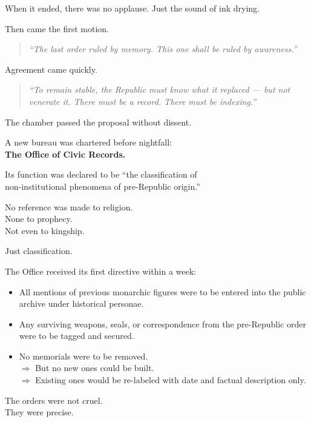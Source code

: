 \documentclass[12pt]{article}
\begin{document}
When it ended, there was no applause. Just the sound of ink drying.

Then came the first motion.

\begin{quote}
\textit{“The last order ruled by memory. This one shall be ruled by awareness.”}
\end{quote}

Agreement came quickly.

\begin{quote}
\textit{“To remain stable, the Republic must know what it replaced --- but not venerate it. There must be a record. There must be indexing.”}
\end{quote}

The chamber passed the proposal without dissent.

A new bureau was chartered before nightfall:\\
\textbf{The Office of Civic Records.}

Its function was declared to be ``the classification of \\
non-institutional phenomena of pre-Republic origin.''

No reference was made to religion.\\
None to prophecy.\\
Not even to kingship.

Just classification.

\vspace{1em}

The Office received its first directive within a week:

\begin{itemize}
    \item All mentions of previous monarchic figures were to be entered into the public archive under historical personae.
    \item Any surviving weapons, seals, or correspondence from the pre-Republic order were to be tagged and secured.
    \item No memorials were to be removed. \\
        \hspace{1em} $\Rightarrow$ But no new ones could be built. \\
        \hspace{1em} $\Rightarrow$ Existing ones would be re-labeled with date and factual description only.
\end{itemize}

The orders were not cruel.\\
They were precise.
\end{document}
